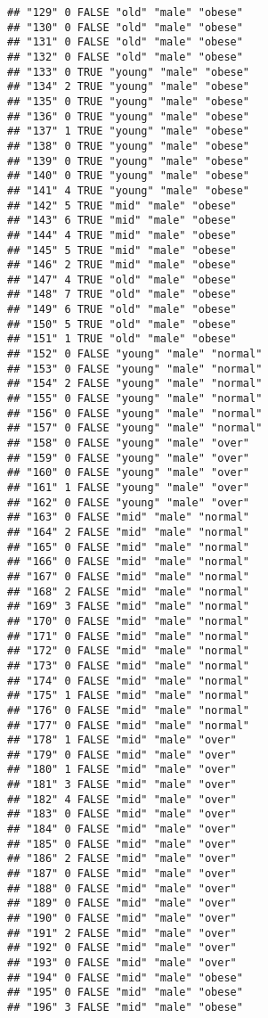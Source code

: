 \documentclass[]{article}
\begin{document}
\begin{verbatim}
## "129" 0 FALSE "old" "male" "obese"
## "130" 0 FALSE "old" "male" "obese"
## "131" 0 FALSE "old" "male" "obese"
## "132" 0 FALSE "old" "male" "obese"
## "133" 0 TRUE "young" "male" "obese"
## "134" 2 TRUE "young" "male" "obese"
## "135" 0 TRUE "young" "male" "obese"
## "136" 0 TRUE "young" "male" "obese"
## "137" 1 TRUE "young" "male" "obese"
## "138" 0 TRUE "young" "male" "obese"
## "139" 0 TRUE "young" "male" "obese"
## "140" 0 TRUE "young" "male" "obese"
## "141" 4 TRUE "young" "male" "obese"
## "142" 5 TRUE "mid" "male" "obese"
## "143" 6 TRUE "mid" "male" "obese"
## "144" 4 TRUE "mid" "male" "obese"
## "145" 5 TRUE "mid" "male" "obese"
## "146" 2 TRUE "mid" "male" "obese"
## "147" 4 TRUE "old" "male" "obese"
## "148" 7 TRUE "old" "male" "obese"
## "149" 6 TRUE "old" "male" "obese"
## "150" 5 TRUE "old" "male" "obese"
## "151" 1 TRUE "old" "male" "obese"
## "152" 0 FALSE "young" "male" "normal"
## "153" 0 FALSE "young" "male" "normal"
## "154" 2 FALSE "young" "male" "normal"
## "155" 0 FALSE "young" "male" "normal"
## "156" 0 FALSE "young" "male" "normal"
## "157" 0 FALSE "young" "male" "normal"
## "158" 0 FALSE "young" "male" "over"
## "159" 0 FALSE "young" "male" "over"
## "160" 0 FALSE "young" "male" "over"
## "161" 1 FALSE "young" "male" "over"
## "162" 0 FALSE "young" "male" "over"
## "163" 0 FALSE "mid" "male" "normal"
## "164" 2 FALSE "mid" "male" "normal"
## "165" 0 FALSE "mid" "male" "normal"
## "166" 0 FALSE "mid" "male" "normal"
## "167" 0 FALSE "mid" "male" "normal"
## "168" 2 FALSE "mid" "male" "normal"
## "169" 3 FALSE "mid" "male" "normal"
## "170" 0 FALSE "mid" "male" "normal"
## "171" 0 FALSE "mid" "male" "normal"
## "172" 0 FALSE "mid" "male" "normal"
## "173" 0 FALSE "mid" "male" "normal"
## "174" 0 FALSE "mid" "male" "normal"
## "175" 1 FALSE "mid" "male" "normal"
## "176" 0 FALSE "mid" "male" "normal"
## "177" 0 FALSE "mid" "male" "normal"
## "178" 1 FALSE "mid" "male" "over"
## "179" 0 FALSE "mid" "male" "over"
## "180" 1 FALSE "mid" "male" "over"
## "181" 3 FALSE "mid" "male" "over"
## "182" 4 FALSE "mid" "male" "over"
## "183" 0 FALSE "mid" "male" "over"
## "184" 0 FALSE "mid" "male" "over"
## "185" 0 FALSE "mid" "male" "over"
## "186" 2 FALSE "mid" "male" "over"
## "187" 0 FALSE "mid" "male" "over"
## "188" 0 FALSE "mid" "male" "over"
## "189" 0 FALSE "mid" "male" "over"
## "190" 0 FALSE "mid" "male" "over"
## "191" 2 FALSE "mid" "male" "over"
## "192" 0 FALSE "mid" "male" "over"
## "193" 0 FALSE "mid" "male" "over"
## "194" 0 FALSE "mid" "male" "obese"
## "195" 0 FALSE "mid" "male" "obese"
## "196" 3 FALSE "mid" "male" "obese"

\end{verbatim}
\end{document}
